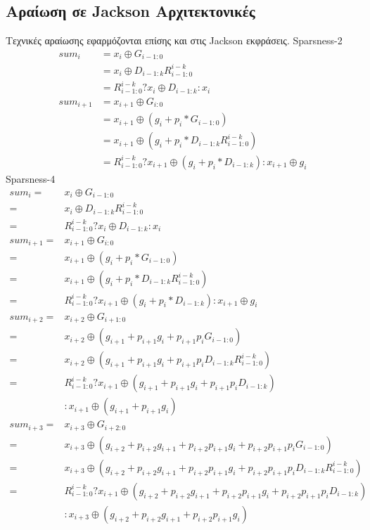 \subsection{Αραίωση σε Jackson Αρχιτεκτονικές}
Τεχνικές αραίωσης εφαρμόζονται επίσης και στις Jackson εκφράσεις.
\label{Jackson_sparse}
Sparsness-2
 \begin{equation*}
    \begin{split}
        sum_i &= x_i \oplus G_{i-1:0}\\
              &= x_i \oplus D_{i-1:k}R^{i-k}_{i-1:0}\\
              &= R^{i-k}_{i-1:0} ? x_i \oplus D_{i-1:k} : x_i\\
        sum_{i+1} &= x_{i+1} \oplus G_{i:0}\\
                  &= x_{i+1} \oplus (g_i + p_i*G_{i-1:0})\\
                  &= x_{i+1} \oplus (g_i + p_i*D_{i-1:k}R^{i-k}_{i-1:0})\\
                  &= R^{i-k}_{i-1:0} ? x_{i+1} \oplus (g_i + p_i*D_{i-1:k}) : x_{i+1} \oplus g_i
    \end{split} 
 \end{equation*}
Sparsness-4
\begin{equation*}
    \begin{split}
        sum_i =& x_i \oplus G_{i-1:0}\\
        =& x_i \oplus D_{i-1:k}R^{i-k}_{i-1:0}\\
        =& R^{i-k}_{i-1:0} ? x_i \oplus D_{i-1:k} : x_i\\
        sum_{i+1} =& x_{i+1} \oplus G_{i:0}\\
        =& x_{i+1} \oplus (g_i + p_i*G_{i-1:0})\\
        =& x_{i+1} \oplus (g_i + p_i*D_{i-1:k}R^{i-k}_{i-1:0})\\
        =& R^{i-k}_{i-1:0} ? x_{i+1} \oplus (g_i + p_i*D_{i-1:k}) : x_{i+1} \oplus g_i\\
        sum_{i+2} =& x_{i+2} \oplus G_{i+1:0}\\
        =& x_{i+2} \oplus (g_{i+1} + p_{i+1}g_i + p_{i+1}p_iG_{i-1:0})\\
        =& x_{i+2} \oplus (g_{i+1} + p_{i+1}g_i + p_{i+1}p_iD_{i-1:k}R^{i-k}_{i-1:0})\\
        =& R^{i-k}_{i-1:0} ? x_{i+1} \oplus (g_{i+1} + p_{i+1}g_i + p_{i+1}p_iD_{i-1:k}) \\&: x_{i+1} \oplus (g_{i+1} + p_{i+1}g_i)\\
        sum_{i+3} =& x_{i+3} \oplus G_{i+2:0}\\
        =& x_{i+3} \oplus (g_{i+2} + p_{i+2}g_{i+1} + p_{i+2}p_{i+1}g_i + p_{i+2}p_{i+1}p_iG_{i-1:0})\\
        =& x_{i+3} \oplus (g_{i+2} + p_{i+2}g_{i+1} + p_{i+2}p_{i+1}g_i + p_{i+2}p_{i+1}p_iD_{i-1:k}R^{i-k}_{i-1:0})\\
        =& R^{i-k}_{i-1:0} ? x_{i+1} \oplus (g_{i+2} + p_{i+2}g_{i+1} + p_{i+2}p_{i+1}g_i + p_{i+2}p_{i+1}p_iD_{i-1:k}) \\&: x_{i+3} \oplus (g_{i+2} + p_{i+2}g_{i+1} + p_{i+2}p_{i+1}g_i)
    \end{split} 
\end{equation*}





